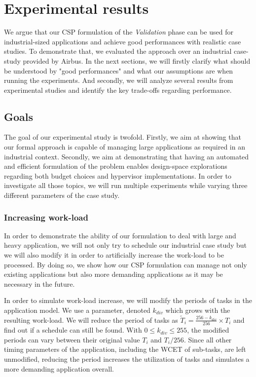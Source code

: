 \documentclass[main.tex]{subfiles}
\begin{document}
\section{Experimental results}
\label{sec_budgetValidation_experimentalRes}

We argue that our CSP formulation of the \emph{Validation} phase can be used for industrial-sized applications and achieve good performances with realistic case studies. To demonstrate that, we evaluated the approach over an industrial case-study provided by Airbus. In the next sections, we will firstly clarify what should be understood by "good performances" and what our assumptions are when running the experiments. And secondly, we will analyze several results from experimental studies and identify the key trade-offs regarding performance.

\subsection{Goals}
\label{ssec_validation_goalsExpe}
The goal of our experimental study is twofold. Firstly, we aim at showing that our formal approach is capable of managing large applications as required in an industrial context. Secondly, we aim at demonstrating that having an automated and efficient formulation of the problem enables design-space explorations regarding both budget choices and hypervisor implementations. In order to investigate all those topics, we will run multiple experiments while varying three different parameters of the case study.

\subsubsection{Increasing work-load}
In order to demonstrate the ability of our formulation to deal with large and heavy application, we will not only try to schedule our industrial case study but we will also modify it in order to artificially increase the work-load to be processed. By doing so, we show how our CSP formulation can manage not only existing applications but also more demanding applications as it may be necessary in the future. 

In order to simulate work-load increase, we will modify the periods of tasks in the application model. We use a parameter, denoted $k_{div}$ which grows with the resulting work-load. We will reduce the period of tasks as $\widetilde{T}_i = \frac{256-k_{div}}{256} \times T_i$ and find out if a schedule can still be found. With $0 \leq k_{div} \leq 255$, the modified periods can vary between their original value $T_i$ and $T_i / 256$. Since all other timing parameters of the application, including the WCET of sub-tasks, are left unmodified, reducing the period increases the utilization of tasks and simulates a more demanding application overall. 
\end{document}
